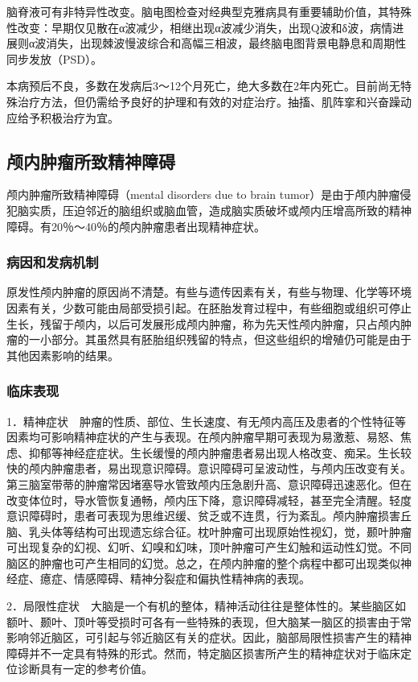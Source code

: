 脑脊液可有非特异性改变。脑电图检查对经典型克雅病具有重要辅助价值，其特殊性改变：早期仅见散在α波减少，相继出现α波减少消失，出现Q波和δ波，病情进展则α波消失，出现棘波慢波综合和高幅三相波，最终脑电图背景电静息和周期性同步发放（PSD）。

本病预后不良，多数在发病后3～12个月死亡，绝大多数在2年内死亡。目前尚无特殊治疗方法，但仍需给予良好的护理和有效的对症治疗。抽搐、肌阵挛和兴奋躁动应给予积极治疗为宜。

\subsection{颅内肿瘤所致精神障碍}

颅内肿瘤所致精神障碍（mental disorders due to brain
tumor）是由于颅内肿瘤侵犯脑实质，压迫邻近的脑组织或脑血管，造成脑实质破坏或颅内压增高所致的精神障碍。有20％～40％的颅内肿瘤患者出现精神症状。

\subsubsection{病因和发病机制}

原发性颅内肿瘤的原因尚不清楚。有些与遗传因素有关，有些与物理、化学等环境因素有关，少数可能由局部受损引起。在胚胎发育过程中，有些细胞或组织可停止生长，残留于颅内，以后可发展形成颅内肿瘤，称为先天性颅内肿瘤，只占颅内肿瘤的一小部分。其虽然具有胚胎组织残留的特点，但这些组织的增殖仍可能是由于其他因素影响的结果。

\subsubsection{临床表现}

1．精神症状　肿瘤的性质、部位、生长速度、有无颅内高压及患者的个性特征等因素均可影响精神症状的产生与表现。在颅内肿瘤早期可表现为易激惹、易怒、焦虑、抑郁等神经症症状。生长缓慢的颅内肿瘤患者易出现人格改变、痴呆。生长较快的颅内肿瘤患者，易出现意识障碍。意识障碍可呈波动性，与颅内压改变有关。第三脑室带蒂的肿瘤常因堵塞导水管致颅内压急剧升高、意识障碍迅速恶化。但在改变体位时，导水管恢复通畅，颅内压下降，意识障碍减轻，甚至完全清醒。轻度意识障碍时，患者可表现为思维迟缓、贫乏或不连贯，行为紊乱。颅内肿瘤损害丘脑、乳头体等结构可出现遗忘综合征。枕叶肿瘤可出现原始性视幻，觉，颞叶肿瘤可出现复杂的幻视、幻听、幻嗅和幻味，顶叶肿瘤可产生幻触和运动性幻觉。不同脑区的肿瘤也可产生相同的幻觉。总之，在颅内肿瘤的整个病程中都可出现类似神经症、癔症、情感障碍、精神分裂症和偏执性精神病的表现。

2．局限性症状　大脑是一个有机的整体，精神活动往往是整体性的。某些脑区如额叶、颞叶、顶叶等受损时可各有一些特殊的表现，但大脑某一脑区的损害由于常影响邻近脑区，可引起与邻近脑区有关的症状。因此，脑部局限性损害产生的精神障碍并不一定具有特殊的形式。然而，特定脑区损害所产生的精神症状对于临床定位诊断具有一定的参考价值。

